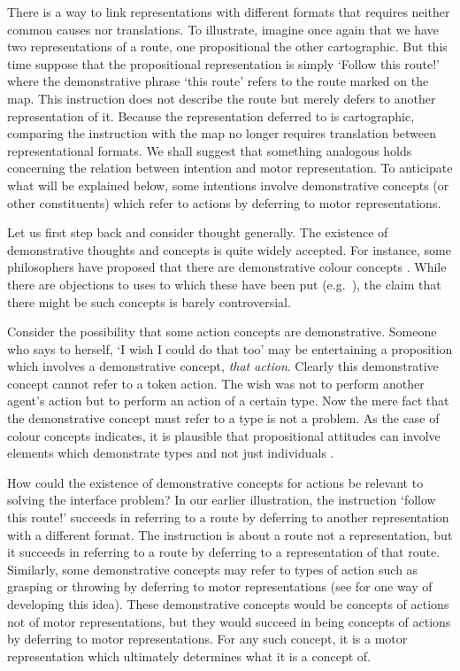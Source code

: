 \documentclass[12pt,\papersize]{extarticle}
\begin{document}
There is a way to link representations with different formats that requires neither common causes nor translations. To illustrate, imagine once again that we have two representations of a route, one propositional the other cartographic. But this time suppose that the propositional representation is simply `Follow this route!' where the demonstrative phrase `this route' refers to the route marked on the map. This instruction does not describe the route but merely defers to another representation of it. Because the representation deferred to is cartographic, comparing the instruction with the map no longer requires translation between representational formats. We shall suggest that something analogous holds concerning the relation between intention and motor representation. To anticipate what will be explained below, some intentions involve demonstrative concepts (or other constituents) which refer to actions by deferring to motor representations.

Let us first step back and consider thought generally. The existence of demonstrative thoughts and concepts is quite widely accepted. For instance, some philosophers have proposed that there are demonstrative colour concepts \citep{McDowell:1996yi,Brewer:1999ud}.  While there are objections to uses to which these have been put (e.g.\ \citealp{heck_jr._nonconceptual_2000,dokic_shades_2001}), the claim that there might be such concepts is barely controversial.

Consider the possibility that some action concepts are demonstrative. Someone who says to herself, `I wish I could do that too' may be entertaining a proposition which involves a demonstrative concept, \emph{that action}. Clearly this demonstrative concept cannot refer to a token action.  The wish was not to perform another agent's action but to perform an action of a certain type. Now the mere fact that the demonstrative concept must refer to a type is not a problem. As the case of colour concepts indicates, it is plausible that propositional attitudes can involve elements which demonstrate types and not just individuals \citep[see also][§3.4]{levine:2010_demonstrative}.

How could the existence of demonstrative concepts for actions be relevant  to solving the interface problem? In our earlier illustration, the instruction `follow this route!' succeeds in referring to a route by deferring to another representation with a different format. The instruction is about a route not a representation, but it succeeds in referring to a route by deferring to a representation of that route. Similarly, some demonstrative concepts may refer to types of action such as grasping or throwing by deferring to motor representations (see \citet{levine:2010_demonstrative} for one way of developing this idea). These demonstrative concepts would be concepts of actions not of motor representations, but they would succeed in being concepts of actions by deferring to motor representations. For any such concept, it is a motor representation which ultimately determines what it is a concept of.
\end{document}
